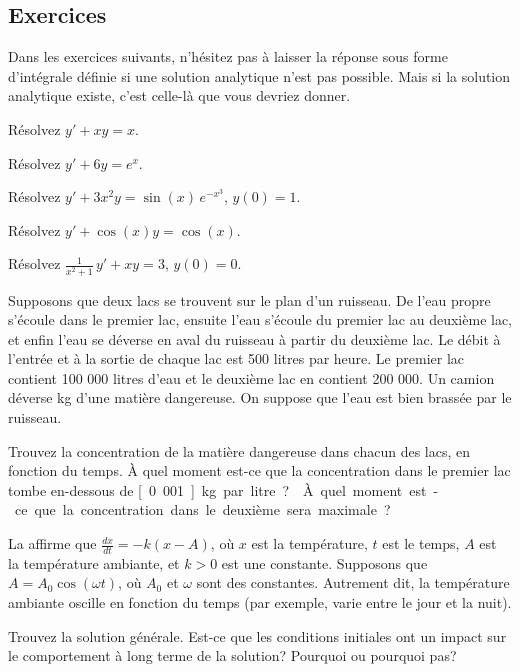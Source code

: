 \subsection{Exercices}

Dans les exercices suivants, n'hésitez pas à laisser la réponse sous forme d'intégrale définie
si une solution analytique n'est pas possible.
Mais si la solution analytique existe, c'est celle-là que vous devriez donner.

\begin{exercise}
	Résolvez $y' + xy = x$.
\end{exercise}

\begin{exercise}
	Résolvez $y' + 6y = e^x$.
\end{exercise}

\begin{exercise}
	Résolvez $y' + 3x^2y = \sin(x) \, e^{-x^3}$, $y(0) = 1$.
\end{exercise}

\begin{exercise}
	Résolvez $y' + \cos (x) y = \cos(x)$.
\end{exercise}

\begin{exercise}
	Résolvez $\frac{1}{x^2+1} \, y' + x y = 3$, $y(0) = 0$.
\end{exercise}

\begin{exercise}
	Supposons que deux lacs se trouvent sur le plan d'un ruisseau. De l'eau propre s'écoule dans le premier lac, ensuite l'eau s'écoule du premier lac au deuxième lac, et enfin l'eau se déverse en aval du ruisseau à partir du deuxième lac. Le débit à l'entrée et à la sortie de chaque lac est 500 litres par heure.  Le premier lac contient 100 000 litres d'eau et le deuxième lac en contient 200 000.  Un camion déverse \unit[500]{kg} d'une matière dangereuse.  On suppose que l'eau est bien brassée par le ruisseau.
	\begin{tasks}
		\task Trouvez la concentration de la matière dangereuse dans chacun des lacs, en fonction du temps.
		\task À quel moment est-ce que la
		concentration dans le premier lac tombe en-dessous de  \unit[0.001]{kg} par litre?
		\task À quel moment est-ce que la concentration dans le deuxième sera maximale?
	\end{tasks}
\end{exercise}

\begin{exercise}
	La  affirme que $\frac{dx}{dt} = -k(x-A)$, où
	$x$ est la température, $t$ est le temps, $A$ est la température ambiante,
	et $k > 0$ est une constante.
	Supposons que $A = A_0 \cos (\omega t)$, où $A_0$ et $\omega$ sont des constantes.  Autrement dit, la température ambiante oscille en fonction du temps (par exemple, varie entre le jour et la nuit).
	\begin{tasks}
	\task Trouvez la solution générale.
	\task Est-ce que les conditions initiales ont un impact sur le comportement à long terme de la solution?  Pourquoi ou pourquoi pas?
	\end{tasks}
\end{exercise}

